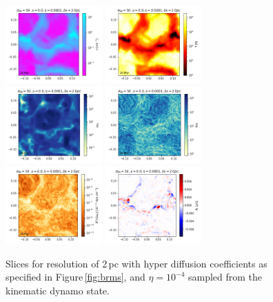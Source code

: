 \documentclass[preprint2]{aastex63}
\begin{document}
\begin{figure}
\centering
\includegraphics[trim=0.0cm 0.00cm 0.0cm 0.0cm,clip=true,width=0.33\textwidth]{csc_figs/rho2pcPm0e-4_00.png}
\includegraphics[trim=0.0cm 0.00cm 0.0cm 0.0cm,clip=true,width=0.33\textwidth]{csc_figs/tt2pcPm0e-4_00.png}
\includegraphics[trim=0.0cm 0.00cm 0.0cm 0.0cm,clip=true,width=0.33\textwidth]{csc_figs/Pm2pcPm0e-4_00.png}
\includegraphics[trim=0.0cm 0.00cm 0.0cm 0.0cm,clip=true,width=0.33\textwidth]{csc_figs/Rm2pcPm0e-4_00.png}
\includegraphics[trim=0.0cm 0.00cm 0.0cm 0.0cm,clip=true,width=0.33\textwidth]{csc_figs/pb2pcPm0e-4_00.png}
\includegraphics[trim=0.0cm 0.00cm 0.0cm 0.0cm,clip=true,width=0.33\textwidth]{csc_figs/bb12pcPm0e-4_00.png}
\caption{
Slices for resolution of 2\,pc with hyper diffusion coefficients as 
specified in Figure\,\ref{fig:brms}, and $\eta=10^{-4}$ sampled from the 
kinematic dynamo state.
\label{fig:2pcUB}
}
\end{figure}
\end{document}
